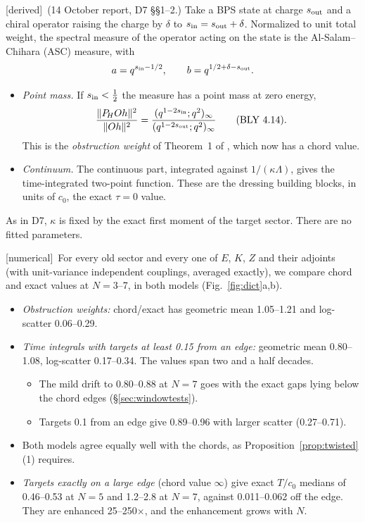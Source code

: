 \documentclass[11pt]{article}
\newcommand{\PH}{P_{\!H}}
\newcommand{\tagbox}[2]{\textsf{\small\color{#1}[#2]}}
\newcommand{\DER}{\tagbox{cder}{derived}}
\newcommand{\NUM}{\tagbox{cnum}{numerical}}
\theoremstyle{plain}
\theoremstyle{remark}
\numberwithin{equation}{section}
\begin{document}
\DER\ (14 October report, D7 \S\S1--2.) Take a BPS state at charge $s_{\rm out}$ and a chiral operator raising the charge
by $\delta$ to $s_{\rm in}=s_{\rm out}+\delta$. Normalized to unit total weight, the spectral measure of the operator acting on
the state is the Al-Salam--Chihara (ASC) measure, with
\[
a=q^{s_{\rm in}-1/2},\qquad b=q^{1/2+\delta-s_{\rm out}} .
\]
\begin{itemize}\itemsep1pt
\item \emph{Point mass.} If $s_{\rm in}<\tfrac12$ the measure has a point mass at zero energy,
  \begin{equation}\label{eq:pm}
  \frac{\|\PH Oh\|^2}{\|Oh\|^2}=\frac{(q^{1-2s_{\rm in}};q^2)_\infty}{(q^{1-2s_{\rm out}};q^2)_\infty}
  \qquad\text{(BLY 4.14)} .
  \end{equation}
  This is the \emph{obstruction weight} of Theorem~1 of \cite{prog1023}, which now has a chord value.
\item \emph{Continuum.} The continuous part, integrated against $1/(\kappa\Lambda)$, gives the time-integrated two-point
  function. These are the dressing building blocks, in units of $c_0$, the exact $\tau=0$ value.
\end{itemize}
As in D7, $\kappa$ is fixed by the exact first moment of the target sector. There are no fitted parameters.

\NUM\ For every old sector and every one of $E$, $K$, $Z$ and their adjoints (with unit-variance independent
couplings, averaged exactly), we compare chord and exact values at $N=3$--7, in both models (Fig.~\ref{fig:dict}a,b).
\begin{itemize}\itemsep1pt
\item \emph{Obstruction weights:} chord/exact has geometric mean 1.05--1.21 and log-scatter 0.06--0.29.
\item \emph{Time integrals with targets at least 0.15 from an edge:} geometric mean 0.80--1.08, log-scatter 0.17--0.34.
  The values span two and a half decades.
  \begin{itemize}\itemsep1pt
  \item The mild drift to 0.80--0.88 at $N=7$ goes with the exact gaps lying below the chord edges (\S\ref{sec:windowtests}).
  \item Targets 0.1 from an edge give 0.89--0.96 with larger scatter (0.27--0.71).
  \end{itemize}
\item Both models agree equally well with the chords, as Proposition~\ref{prop:twisted}(1) requires.
\item \emph{Targets exactly on a large edge} (chord value $\infty$) give exact $T/c_0$ medians of 0.46--0.53 at $N=5$ and
  1.2--2.8 at $N=7$, against 0.011--0.062 off the edge. They are enhanced 25--250$\times$, and the enhancement grows with
  $N$.
\end{itemize}
\end{document}
